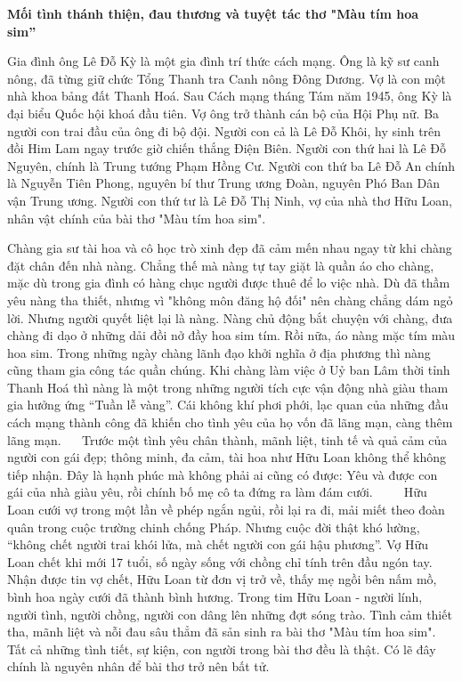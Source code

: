 \documentclass[../main.tex]{subfiles}
\begin{document}
\begin{multicols}{2}
\textbf{Mối tình thánh thiện, đau thương và tuyệt tác thơ "Màu tím hoa sim”}    \textbf{   } 
\begin{blockquote}
Gia đình ông Lê Đỗ Kỳ là một gia đình trí thức cách mạng. Ông là kỹ sư canh nông, đã từng giữ chức Tổng Thanh tra Canh nông Đông Dương. Vợ là con một nhà khoa bảng đất Thanh Hoá. Sau Cách mạng tháng Tám năm 1945, ông Kỳ là đại biểu Quốc hội khoá đầu tiên. Vợ ông trở thành cán bộ của Hội Phụ nữ. Ba người con trai đầu của ông đi bộ đội. Người con cả là Lê Đỗ Khôi, hy sinh trên đồi Him Lam ngay trước giờ chiến thắng Điện Biên. Người con thứ hai là Lê Đỗ Nguyên, chính là Trung tướng Phạm Hồng Cư. Người con thứ ba Lê Đỗ An chính là Nguyễn Tiên Phong, nguyên bí thư Trung ương Đoàn, nguyên Phó Ban Dân vận Trung ương. Người con thứ tư là Lê Đỗ Thị Ninh, vợ của nhà thơ Hữu Loan, nhân vật chính của bài thơ "Màu tím hoa sim". \end{blockquote}
 Chàng gia sư tài hoa và cô học trò xinh đẹp đã cảm mến nhau ngay từ khi chàng đặt chân đến nhà nàng. Chẳng thế mà nàng tự tay giặt là quần áo cho chàng, mặc dù trong gia đình có hàng chục người được thuê để lo việc nhà. Dù đã thầm yêu nàng tha thiết, nhưng vì "không môn đăng hộ đối" nên chàng chẳng dám ngỏ lời. Nhưng người quyết liệt lại là nàng. Nàng chủ động bắt chuyện với chàng, đưa chàng đi dạo ở những dải đồi nở đầy hoa sim tím. Rồi nữa, áo nàng mặc tím màu hoa sim. Trong những ngày chàng lãnh đạo khởi nghĩa ở địa phương thì nàng cũng tham gia công tác quần chúng. Khi chàng làm việc ở Uỷ ban Lâm thời tỉnh Thanh Hoá thì nàng là một trong những người tích cực vận động nhà giàu tham gia hưởng ứng “Tuần lễ vàng”. Cái không khí phơi phới, lạc quan của những đầu cách mạng thành công đã khiến cho tình yêu của họ vốn đã lãng mạn, càng thêm lãng mạn. 
    
Trước một tình yêu chân thành, mãnh liệt, tinh tế và quả cảm của người con gái đẹp; thông minh, đa cảm, tài hoa như Hữu Loan không thể không tiếp nhận. Đây là hạnh phúc mà không phải ai cũng có được: Yêu và được con gái của nhà giàu yêu, rồi chính bố mẹ cô ta đứng ra làm đám cưới. 
     
Hữu Loan cưới vợ trong một lần về phép ngắn ngủi, rồi lại ra đi, mải miết theo đoàn quân trong cuộc trường chinh chống Pháp. Nhưng cuộc đời thật khó lường, “không chết người trai khói lửa, mà chết người con gái hậu phương”. Vợ Hữu Loan chết khi mới 17 tuổi, số ngày sống với chồng chỉ tính trên đầu ngón tay.  
     
Nhận được tin vợ chết, Hữu Loan từ đơn vị trở về, thấy mẹ ngồi bên nấm mồ, bình hoa ngày cưới đã thành bình hương. Trong tim Hữu Loan - người lính, người tình, người chồng, người con dâng lên những đợt sóng trào. Tình cảm thiết tha, mãnh liệt và nỗi đau sâu thẳm đã sản sinh ra bài thơ "Màu tím hoa sim". Tất cả những tình tiết, sự kiện, con người trong bài thơ đều là thật. Có lẽ đây chính là nguyên nhân để bài thơ trở nên bất tử.  

\end{multicols}
\end{document}
